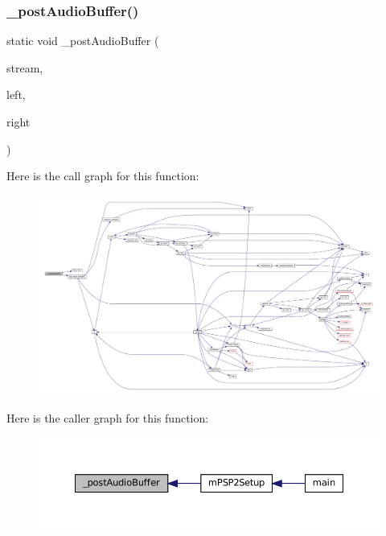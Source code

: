 \subsubsection{\texorpdfstring{\+\_\+post\+Audio\+Buffer()}{\_postAudioBuffer()}}
{\footnotesize\ttfamily static void \+\_\+post\+Audio\+Buffer (\begin{DoxyParamCaption}\item[{struct m\+A\+V\+Stream $\ast$}]{stream,  }\item[{blip\+\_\+t $\ast$}]{left,  }\item[{blip\+\_\+t $\ast$}]{right }\end{DoxyParamCaption})\hspace{0.3cm}{\ttfamily [static]}}

Here is the call graph for this function\+:
\nopagebreak
\begin{figure}[H]
\begin{center}
\leavevmode
\includegraphics[width=350pt]{psp2-context_8c_a2505e2cf7b8b3afbc22087cc337213ac_cgraph}
\end{center}
\end{figure}
Here is the caller graph for this function\+:
\nopagebreak
\begin{figure}[H]
\begin{center}
\leavevmode
\includegraphics[width=350pt]{psp2-context_8c_a2505e2cf7b8b3afbc22087cc337213ac_icgraph}
\end{center}
\end{figure}
\mbox{\label{psp2-context_8c_aa764e37dc09625e703361dd3deb193ed}} 
